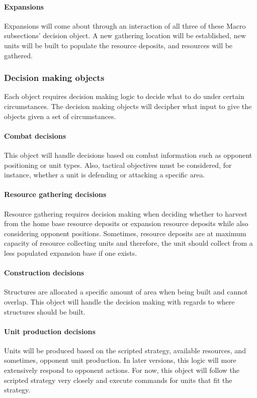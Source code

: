\documentclass[10pt,letterpaper,onecolumn,draftclsnofoot]{IEEEtran}
\begin{document}
\paragraph{Expansions}
Expansions will come about through an interaction of all three of these Macro subsections' decision object. A new gathering location will be established, new units will be built to populate the resource deposits, and resources will be gathered.

\subsubsection{Decision making objects}
Each object requires decision making logic to decide what to do under certain circumstances. The decision making objects will decipher what input to give the objects given a set of circumstances.

\paragraph{Combat decisions}
This object will handle decisions based on combat information such as opponent positioning or unit types. Also, tactical objectives must be considered, for instance, whether a unit is defending or attacking a specific area.

\paragraph{Resource gathering decisions}
Resource gathering requires decision making when deciding whether to harvest from the home base resource deposits or expansion resource deposits while also considering opponent positions. Sometimes, resource deposits are at maximum capacity of resource collecting units and therefore, the unit should collect from a less populated expansion base if one exists.

\paragraph{Construction decisions}
Structures are allocated a specific amount of area when being built and cannot overlap. This object will handle the decision making with regards to where structures should be built. 

\paragraph{Unit production decisions}
Units will be produced based on the scripted strategy, available resources, and sometimes, opponent unit production. In later versions, this logic will more extensively respond to opponent actions. For now, this object will follow the scripted strategy very closely and execute commands for units that fit the strategy.
\end{document}
